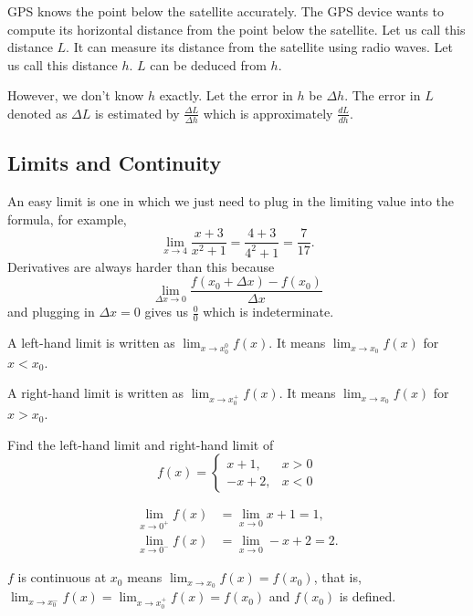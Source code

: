 \begin{example}
GPS knows the point below the satellite accurately. The GPS device wants
to compute its horizontal distance from the point below the satellite.
Let us call this distance \( L \). It can measure its distance from the
satellite using radio waves. Let us call this distance \( h \). \( L \)
can be deduced from \( h \).

However, we don't know \( h \) exactly. Let the error in \( h \) be \(
\Delta h \). The error in \( L \) denoted as \( \Delta L \) is estimated
by \( \frac{\Delta L}{\Delta h} \) which is approximately \(
\frac{dL}{dh} \).
\end{example}


\subsection{Limits and Continuity}

An easy limit is one in which we just need to plug in the limiting value
into the formula, for example,
\[
    \lim_{x \to 4} \frac{x + 3}{x^2 + 1}
        = \frac{4 + 3}{4^2 + 1}
        = \frac{7}{17}.
\]
Derivatives are always harder than this because
\[
    \lim_{\Delta x \to 0} \frac{f(x_0 + \Delta x) - f(x_0)}{\Delta x}
\]
and plugging in \( \Delta x = 0 \) gives us \( \frac{0}{0} \) which is
indeterminate.

A left-hand limit is written as \( \lim_{x \to x_0^0} f(x) \). It means
\( \lim_{x \to x_0} f(x) \) for \( x < x_0 \).

A right-hand limit is written as \( \lim_{x \to x_0^+} f(x) \). It means
\( \lim_{x \to x_0} f(x) \) for \( x > x_0 \).

\begin{example}
Find the left-hand limit and right-hand limit of
\[
    f(x) =
        \begin{cases}
            x + 1,  & x > 0 \\
            -x + 2, & x < 0
        \end{cases}
\]
\end{example}
\begin{solution}
\begin{align*}
    \lim_{x \to 0^+} f(x) & = \lim_{x \to 0} x + 1 = 1, \\
    \lim_{x \to 0^-} f(x) & = \lim_{x \to 0} -x + 2 = 2.
\end{align*}
\end{solution}

\begin{definition}
\( f \) is continuous at \( x_0 \) means \( \lim_{x \to x_0} f(x) =
f(x_0) \), that is, \( \lim_{x \to x_0^-} f(x) = \lim_{x \to x_0^+} f(x)
= f(x_0) \) and \( f(x_0) \) is defined.
\end{definition}


